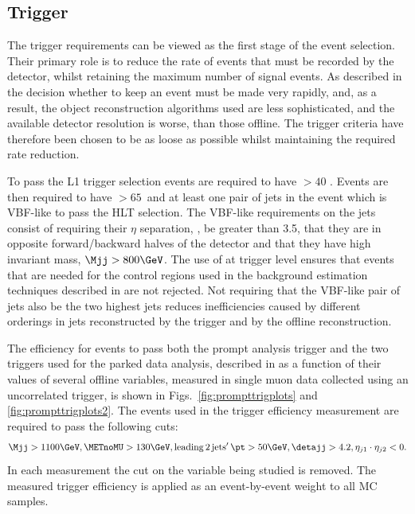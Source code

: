 \subsection{Trigger}
\label{sec:prompttrig}
The trigger requirements can be viewed as the first stage of the event selection. Their primary role is to reduce the rate of events that must be recorded by the detector, whilst retaining the maximum number of signal events. As described in  the decision whether to keep an event must be made very rapidly, and, as a result, the object reconstruction algorithms used are less sophisticated, and the available detector resolution is worse, than those offline. The trigger criteria have therefore been chosen to be as loose as possible whilst maintaining the required rate reduction.

To pass the \ac{L1} trigger selection events are required to have \MET$>40$ \GeV. Events are then required to have \METnoMU$>65$\GeV\, and at least one pair of jets in the event which is \ac{VBF}-like to pass the \ac{HLT} selection. The \ac{VBF}-like requirements on the jets consist of requiring their $\eta$ separation, \detajj, be greater than 3.5, that they are in opposite forward/backward halves of the detector and that they have high invariant mass, $\Mjj>800 \GeV$. The use of \METnoMU at trigger level ensures that events that are needed for the control regions used in the background estimation techniques described in  are not rejected. Not requiring that the \ac{VBF}-like pair of jets also be the two highest \pt jets reduces inefficiencies caused by different \pt orderings in jets reconstructed by the trigger and by the offline reconstruction.

The efficiency for events to pass both the prompt analysis trigger and the two triggers used for the parked data analysis, described in  as a function of their values of several offline variables, measured in single muon data collected using an uncorrelated trigger, is shown in Figs.~\ref{fig:prompttrigplots} and \ref{fig:prompttrigplots2}. The events used in the trigger efficiency measurement are required to pass the following cuts:
\begin{equation}
  \label{eq:prompttrigstudycuts}
  \Mjj>1100 \GeV, \METnoMU>130 \GeV, \mathrm{leading\,2\,jets'\,} \pt>50 \GeV, \detajj>4.2,\eta_{j1}\cdot\eta_{j2}<0.
\end{equation}
In each measurement the cut on the variable being studied is removed. The measured trigger efficiency is applied as an event-by-event weight to all \ac{MC} samples.

